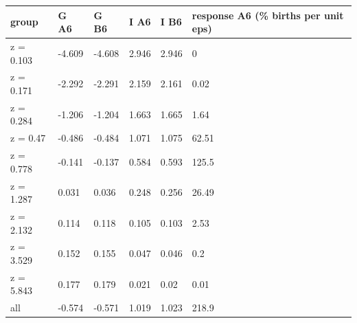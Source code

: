 \begingroup\small
\setlength{\tabcolsep}{3pt}
\renewcommand{\arraystretch}{1.04}
\begin{tabularx}{\linewidth}{XXXXXX}
\toprule
group & G A6 & G B6 & I A6 & I B6 & response A6 (\% births per unit eps) \\
\midrule
z = 0.103 & -4.609 & -4.608 & 2.946 & 2.946 & 0 \\
z = 0.171 & -2.292 & -2.291 & 2.159 & 2.161 & 0.02 \\
z = 0.284 & -1.206 & -1.204 & 1.663 & 1.665 & 1.64 \\
z = 0.47 & -0.486 & -0.484 & 1.071 & 1.075 & 62.51 \\
z = 0.778 & -0.141 & -0.137 & 0.584 & 0.593 & 125.5 \\
z = 1.287 & 0.031 & 0.036 & 0.248 & 0.256 & 26.49 \\
z = 2.132 & 0.114 & 0.118 & 0.105 & 0.103 & 2.53 \\
z = 3.529 & 0.152 & 0.155 & 0.047 & 0.046 & 0.2 \\
z = 5.843 & 0.177 & 0.179 & 0.021 & 0.02 & 0.01 \\
all & -0.574 & -0.571 & 1.019 & 1.023 & 218.9 \\
\bottomrule
\end{tabularx}
\endgroup
